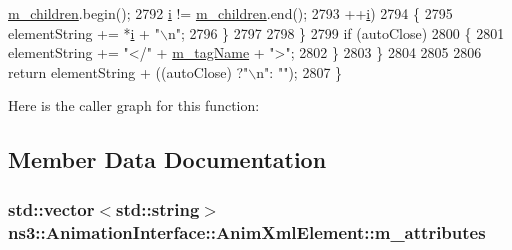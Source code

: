 \begin{DoxyCode}
      \hyperlink{classns3_1_1AnimationInterface_1_1AnimXmlElement_a6c6c49600585414afdfd7c736d12acfe}{m\_children}.begin();
2792                                         \hyperlink{bernuolliDistribution_8m_a6f6ccfcf58b31cb6412107d9d5281426}{i} != \hyperlink{classns3_1_1AnimationInterface_1_1AnimXmlElement_a6c6c49600585414afdfd7c736d12acfe}{m\_children}.end();
2793                                         ++\hyperlink{bernuolliDistribution_8m_a6f6ccfcf58b31cb6412107d9d5281426}{i})
2794                                 \{
2795                                         elementString += *\hyperlink{bernuolliDistribution_8m_a6f6ccfcf58b31cb6412107d9d5281426}{i} + \textcolor{stringliteral}{"\(\backslash\)n"};
2796                                 \}
2797 
2798                         \}
2799                         \textcolor{keywordflow}{if} (autoClose)
2800                         \{
2801                                 elementString += \textcolor{stringliteral}{"</"} + \hyperlink{classns3_1_1AnimationInterface_1_1AnimXmlElement_ad4d74a21b7ab46e5cb74947e923c1671}{m\_tagName} + \textcolor{stringliteral}{">"};
2802                         \}
2803                 \}
2804 
2805         
2806         \textcolor{keywordflow}{return} elementString + ((autoClose) ?\textcolor{stringliteral}{"\(\backslash\)n"}: \textcolor{stringliteral}{""});
2807 \}
\end{DoxyCode}


Here is the caller graph for this function\+:




\subsection{Member Data Documentation}
\subsubsection[{\texorpdfstring{m\+\_\+attributes}{m_attributes}}]{\setlength{\rightskip}{0pt plus 5cm}std\+::vector$<$std\+::string$>$ ns3\+::\+Animation\+Interface\+::\+Anim\+Xml\+Element\+::m\+\_\+attributes\hspace{0.3cm}{\ttfamily [private]}}\hypertarget{classns3_1_1AnimationInterface_1_1AnimXmlElement_a9f5e8e7ead9145810f613ffc189ac291}{}\label{classns3_1_1AnimationInterface_1_1AnimXmlElement_a9f5e8e7ead9145810f613ffc189ac291}



